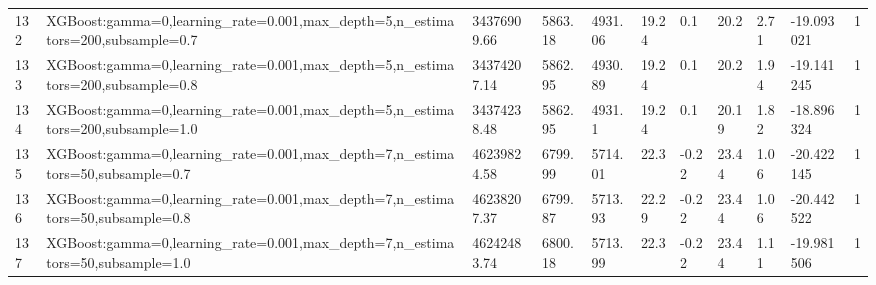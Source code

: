 \begin{longtable}{C{0.8cm} L{2cm} C{1.15cm} C{1.15cm} C{1.15cm} C{1.15cm} C{0.85cm} C{1.25cm} C{1.2cm} C{1.5cm} C{1.0cm}}
132 & XGBoost:\newline gamma=0,\newline learning\_rate=0.001,\newline max\_depth=5,\newline n\_estimators=200,\newline subsample=0.7 & 34376909.66 & 5863.18 & 4931.06 & 19.24 & 0.1 & 20.2 & 2.71 & -19.093021 & 1 \\
133 & XGBoost:\newline gamma=0,\newline learning\_rate=0.001,\newline max\_depth=5,\newline n\_estimators=200,\newline subsample=0.8 & 34374207.14 & 5862.95 & 4930.89 & 19.24 & 0.1 & 20.2 & 1.94 & -19.141245 & 1 \\
134 & XGBoost:\newline gamma=0,\newline learning\_rate=0.001,\newline max\_depth=5,\newline n\_estimators=200,\newline subsample=1.0 & 34374238.48 & 5862.95 & 4931.1 & 19.24 & 0.1 & 20.19 & 1.82 & -18.896324 & 1 \\
135 & XGBoost:\newline gamma=0,\newline learning\_rate=0.001,\newline max\_depth=7,\newline n\_estimators=50,\newline subsample=0.7 & 46239824.58 & 6799.99 & 5714.01 & 22.3 & -0.22 & 23.44 & 1.06 & -20.422145 & 1 \\
136 & XGBoost:\newline gamma=0,\newline learning\_rate=0.001,\newline max\_depth=7,\newline n\_estimators=50,\newline subsample=0.8 & 46238207.37 & 6799.87 & 5713.93 & 22.29 & -0.22 & 23.44 & 1.06 & -20.442522 & 1 \\
137 & XGBoost:\newline gamma=0,\newline learning\_rate=0.001,\newline max\_depth=7,\newline n\_estimators=50,\newline subsample=1.0 & 46242483.74 & 6800.18 & 5713.99 & 22.3 & -0.22 & 23.44 & 1.11 & -19.981506 & 1 \\

\end{longtable}
